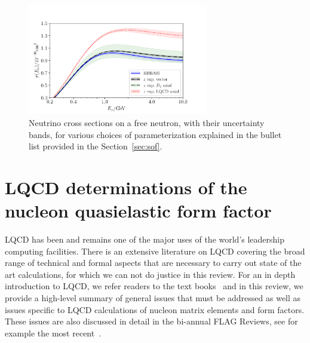 \documentclass{ar-1col}
\def\del#1{}
\def\done#1{{\color{brown}#1}}
\begin{document}
\begin{figure}[hbt!]
 \centering
 \includegraphics[width=0.7\textwidth]{plots/xsec_comparison-standalone.pdf}\vspace{4pt}
\caption{
 Neutrino cross sections on a free neutron, with their uncertainty bands,
 for various choices of parameterization explained in the bullet list provided in the \done{Section~\ref{sec:sof}}.
 \label{fig:nucleonxsec}
}
\end{figure}


\section{LQCD determinations of the nucleon quasielastic form factor\label{sec:lqcd}}

LQCD has been and remains one of the major uses of the world's leadership computing facilities.
There is an extensive literature on LQCD covering the broad range of technical and formal aspects that are necessary to carry out state of the art calculations, for which we can not do justice in this review.
\del{Rather, f}For an in depth introduction to LQCD, we refer readers to the text books~\cite{Smit:2002ug,DeGrand:2006zz,Gattringer:2010zz} and in this review, we provide a high-level summary of general issues that must be addressed as well as issues specific to LQCD calculations of nucleon matrix elements and form factors.
These issues are also discussed in detail in the bi-annual FLAG Reviews, see for example the most recent~\cite{Aoki:2021kgd}.%
\begin{marginnote}
\end{marginnote}
\end{document}
